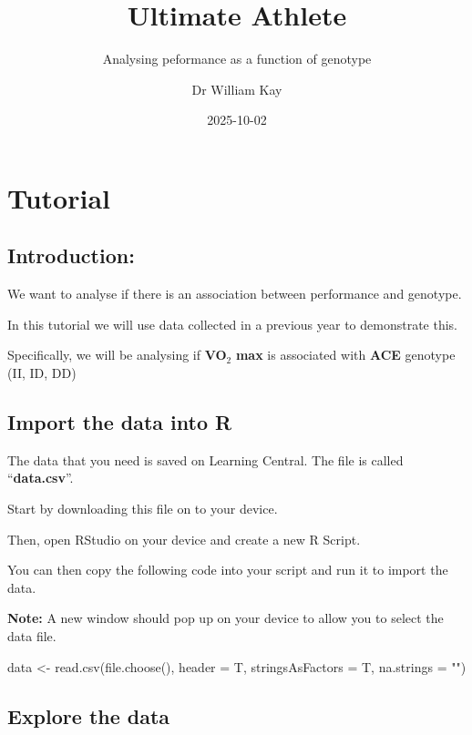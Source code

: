 \documentclass[
  letterpaper,
  DIV=11,
  numbers=noendperiod]{scrartcl}
\title{Ultimate Athlete}
\subtitle{Analysing peformance as a function of genotype}
\author{Dr William Kay}
\date{2025-10-02}
\newenvironment{Shaded}{\begin{snugshade}}{\end{snugshade}}
\newcommand{\AttributeTok}[1]{\textcolor[rgb]{0.40,0.45,0.13}{#1}}
\newcommand{\FunctionTok}[1]{\textcolor[rgb]{0.28,0.35,0.67}{#1}}
\newcommand{\NormalTok}[1]{\textcolor[rgb]{0.00,0.23,0.31}{#1}}
\newcommand{\OtherTok}[1]{\textcolor[rgb]{0.00,0.23,0.31}{#1}}
\newcommand{\StringTok}[1]{\textcolor[rgb]{0.13,0.47,0.30}{#1}}
\begin{document}
\maketitle


\section{Tutorial}\label{tutorial}

\subsection{Introduction:}\label{introduction}

We want to analyse if there is an association between performance and
genotype.

In this tutorial we will use data collected in a previous year to
demonstrate this.

Specifically, we will be analysing if \textbf{VO}\(_2\) \textbf{max} is
associated with \textbf{ACE} genotype (II, ID, DD)

\subsection{Import the data into R}\label{import-the-data-into-r}

The data that you need is saved on Learning Central. The file is called
``\textbf{data.csv}''.

Start by downloading this file on to your device.

Then, open RStudio on your device and create a new R Script.

You can then copy the following code into your script and run it to
import the data.

\textbf{Note:} A new window should pop up on your device to allow you to
select the data file.

\begin{Shaded}
\begin{Highlighting}[]
\NormalTok{data }\OtherTok{\textless{}{-}} \FunctionTok{read.csv}\NormalTok{(}\FunctionTok{file.choose}\NormalTok{(), }\AttributeTok{header =}\NormalTok{ T, }\AttributeTok{stringsAsFactors =}\NormalTok{ T, }\AttributeTok{na.strings =} \StringTok{""}\NormalTok{)}
\end{Highlighting}
\end{Shaded}

\subsection{Explore the data}\label{explore-the-data}
\end{document}
